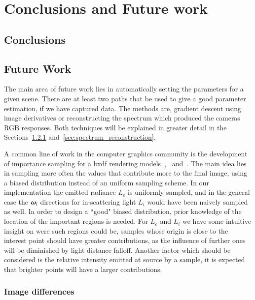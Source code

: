 \chapter{Conclusions and Future work}
\label{ch:conclusions}

\section{Conclusions}

\section{Future Work}

The main area of future work lies in automatically setting the parameters for a given scene.
There are at least two paths that be used to give a good parameter estimation, if we have captured data.
The methods are, gradient descent using image derivatives or reconstructing the spectrum which produced the cameras RGB responses.
Both techniques will be explained in greater detail in the Sections~\ref{sec:image_differences} and~\ref{sec:spectrum_reconstruction}.

A common line of work in the computer graphics community is the development of importance sampling for a bxdf rendering models~\cite{Lawrence:2004},~\cite{Ou:2012} and~\cite{Wang:2014}.
The main idea lies in sampling more often the values that contribute more to the final image, using a biased distribution instead of an uniform sampling scheme.
In our implementation the emitted radiance $L_e$ is uniformly sampled, and in the general case the $\boldsymbol{\omega}_i$ directions for in-scattering light $L_i$ would have been naively sampled as well.
In order to design a ``good" biased distribution, prior knowledge of the location of the important regions is needed. 
For $L_e$ and $L_i$ we have some intuitive insight on were such regions could be, samples whose origin is close to the interest point should have greater contributions, as the influence of further ones will be diminished by light distance falloff.
Another factor which should be considered is the relative intensity emitted at source by a sample, it is expected that brighter points will have a larger contributions. 

\subsection{Image differences}
\label{sec:image_differences}

